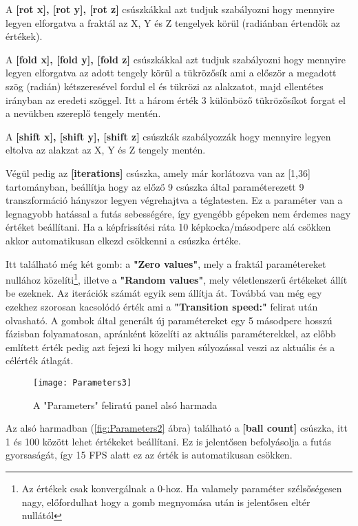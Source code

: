 A \textbf{[rot x], [rot y], [rot z]} csúszkákkal azt tudjuk szabályozni hogy mennyire legyen elforgatva a fraktál az X, Y és Z tengelyek körül (radiánban értendők az értékek). 

A \textbf{[fold x], [fold y], [fold z]} csúszkákkal azt tudjuk szabályozni hogy mennyire legyen elforgatva az adott tengely körül a tükrözősík  ami a először a megadott szög (radián) kétszeresével fordul el és tükrözi az alakzatot, majd ellentétes irányban az eredeti szöggel. Itt a három érték 3 különböző tükrözősíkot forgat el a nevükben szereplő tengely mentén. 

A \textbf{[shift x], [shift y], [shift z]} csúszkák szabályozzák hogy mennyire legyen eltolva az alakzat az X, Y és Z tengely mentén.

Végül pedig az \textbf{[iterations]} csúszka, amely már korlátozva van az [1,36] tartományban, beállítja hogy az előző 9 csúszka által paraméterezett 9 transzformáció hányszor legyen végrehajtva a téglatesten. Ez a paraméter van a legnagyobb hatással a futás sebességére, így gyengébb gépeken nem érdemes nagy értéket beállítani. Ha a képfrissítési ráta 10 képkocka/másodperc alá csökken akkor automatikusan elkezd csökkenni a csúszka értéke.

Itt található még két gomb: a \textbf{"Zero values"}, mely a fraktál paramétereket nullához közelíti\footnote{Az értékek csak konvergálnak a 0-hoz. Ha valamely paraméter szélsőségesen nagy, előfordulhat hogy a gomb megnyomása után is jelentősen eltér nullától}, illetve a \textbf{"Random values"}, mely véletlenszerű értékeket állít be ezeknek. Az iterációk számát egyik sem állítja át. Továbbá van még egy ezekhez szorosan kacsolódó érték ami a \textbf{"Transition speed:"} felirat után olvasható. A gombok által generált új paramétereket egy 5 másodperc hosszú fázisban folyamatosan, apránként közelíti az aktuális paraméterekkel, az előbb említett érték pedig azt fejezi ki hogy milyen súlyozással veszi az aktuális és a célérték átlagát.

\begin{figure}[H]
	\centering
	\texttt{[image: Parameters3]}
	\caption{A "Parameters" feliratú panel alsó harmada}
	\label{fig:Parameters3}
\end{figure}

Az alsó harmadban (\ref{fig:Parameters2} ábra) található a \textbf{[ball count]} csúszka, itt 1 és 100 között lehet értékeket beállítani. Ez is jelentősen befolyásolja a futás gyorsaságát, így 15 FPS alatt ez az érték is automatikusan csökken.

